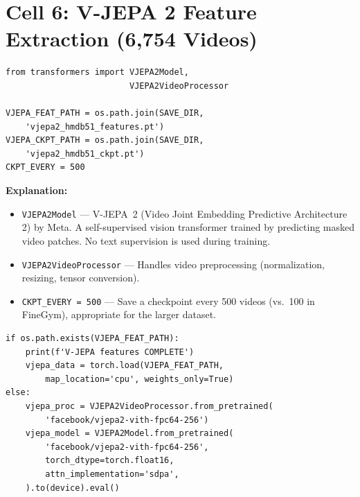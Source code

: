 \documentclass[a4paper, 12pt]{article}
\newenvironment{explanation}{%
  \par\smallskip
  \noindent\textcolor{blue!70!black}{\textbf{Explanation:}}\\
  \noindent
}{\par\medskip}
\begin{document}
\newpage
\section{Cell 6: V-JEPA 2 Feature Extraction (6,754 Videos)}

\begin{lstlisting}
from transformers import VJEPA2Model,
                         VJEPA2VideoProcessor

VJEPA_FEAT_PATH = os.path.join(SAVE_DIR,
    'vjepa2_hmdb51_features.pt')
VJEPA_CKPT_PATH = os.path.join(SAVE_DIR,
    'vjepa2_hmdb51_ckpt.pt')
CKPT_EVERY = 500
\end{lstlisting}

\begin{explanation}
\begin{itemize}[nosep]
  \item \texttt{VJEPA2Model} --- V-JEPA~2 (Video Joint Embedding Predictive Architecture 2) by Meta. A self-supervised vision transformer trained by predicting masked video patches. No text supervision is used during training.
  \item \texttt{VJEPA2VideoProcessor} --- Handles video preprocessing (normalization, resizing, tensor conversion).
  \item \texttt{CKPT\_EVERY = 500} --- Save a checkpoint every 500 videos (vs.\ 100 in FineGym), appropriate for the larger dataset.
\end{itemize}
\end{explanation}

\begin{lstlisting}
if os.path.exists(VJEPA_FEAT_PATH):
    print(f'V-JEPA features COMPLETE')
    vjepa_data = torch.load(VJEPA_FEAT_PATH,
        map_location='cpu', weights_only=True)
else:
    vjepa_proc = VJEPA2VideoProcessor.from_pretrained(
        'facebook/vjepa2-vith-fpc64-256')
    vjepa_model = VJEPA2Model.from_pretrained(
        'facebook/vjepa2-vith-fpc64-256',
        torch_dtype=torch.float16,
        attn_implementation='sdpa',
    ).to(device).eval()
\end{lstlisting}
\end{document}
